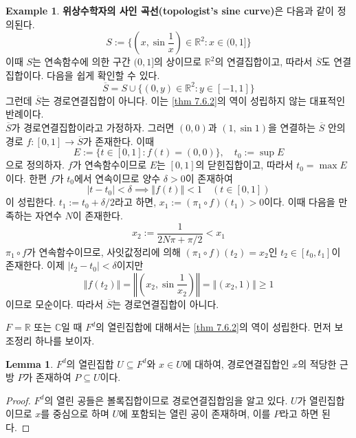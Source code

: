 \documentclass[11pt]{book}
\numberwithin{equation}{chapter}
\def\RR{\mathbb{R}}
\def\CC{\mathbb{C}}
\newcommand{\abs}[1]{\left\vert#1\right\vert}
\newcommand{\norm}[1]{\left\Vert#1\right\Vert}
\newcommand{\paren}[1]{\left(#1\right)}
\theoremstyle{definition}
\newtheorem{lem}[thm]{Lemma}
\newtheorem*{ex}{Example}
\begin{document}
\begin{ex}
    \textbf{위상수학자의 사인 곡선(topologist's sine curve)}은 다음과 같이 정의된다.
    \[
      S := \{\paren{x, \sin \frac{1}{x}} \in \RR^2 : x \in (0, 1]\}  
    \]
    이때 \(S\)는 연속함수에 의한 구간 \((0, 1]\)의 상이므로 \(\RR^2\)의 연결집합이고, 따라서 \(\overline{S}\)도 연결집합이다. 다음을 쉽게 확인할 수 있다.
    \[
      \overline{S} = S \cup \{(0, y) \in \RR^2 : y \in [-1, 1]\} 
    \]
    그런데 \(\overline{S}\)는 경로연결집합이 아니다. 이는 \ref{thm 7.6.2}의 역이 성립하지 않는 대표적인 반례이다.\\
    \(\overline{S}\)가 경로연결집합이라고 가정하자. 그러면 \((0, 0)\)과 \((1, \sin 1)\)을 연결하는 \(\overline{S}\) 안의 경로 \(f : [0, 1] \to \overline{S}\)가 존재한다. 이때
    \[
        E := \{t \in [0, 1] : f(t) = (0, 0)\}, \quad t_0 := \sup E  
    \]
    으로 정의하자. \(f\)가 연속함수이므로 \(E\)는 \([0, 1]\)의 닫힌집합이고, 따라서 \(t_0 = \max E\)이다. 한편 \(f\)가 \(t_0\)에서 연속이므로 양수 \(\delta > 0\)이 존재하여
    \[
        \abs{t - t_0} < \delta \implies \norm{f(t)} < 1 \quad (t \in [0, 1])
    \]
    이 성립한다. \(t_1 := t_0 + \delta / 2\)라고 하면, \(x_1 := (\pi_1 \circ f) (t_1) > 0\)이다. 이때 다음을 만족하는 자연수 \(N\)이 존재한다.
    \[
    x_2 := \frac{1}{2N\pi + \pi/2} < x_1   
    \]
    \(\pi_1 \circ f\)가 연속함수이므로, 사잇값정리에 의해 \((\pi_1 \circ f)(t_2) = x_2\)인 \(t_2 \in [t_0, t_1]\)이 존재한다. 이제 \(\abs{t_2 - t_0} < \delta\)이지만
    \[
    \norm{f(t_2)} = \norm{\paren{x_2, \sin \frac{1}{x_2}}} = \norm{(x_2, 1)} \ge 1
    \]
    이므로 모순이다. 따라서 \(\overline{S}\)는 경로연결집합이 아니다.
\end{ex}

\(F = \RR\) 또는 \(\CC\)일 때 \(F^d\)의 열린집합에 대해서는 \ref{thm 7.6.2}의 역이 성립한다. 먼저 보조정리 하나를 보이자.

\begin{lem} \label{lem 7.6.3}
    \(F^d\)의 열린집합 \(U \subseteq F^d\)와 \(x \in U\)에 대하여, 경로연결집합인 \(x\)의 적당한 근방 \(P\)가 존재하여 \(P \subseteq U\)이다.
\end{lem}
\begin{proof}
    \(F^d\)의 열린 공들은 볼록집합이므로 경로연결집합임을 알고 있다. \(U\)가 열린집합이므로 \(x\)를 중심으로 하며 \(U\)에 포함되는 열린 공이 존재하며, 이를 \(P\)라고 하면 된다.
\end{proof}
\end{document}
